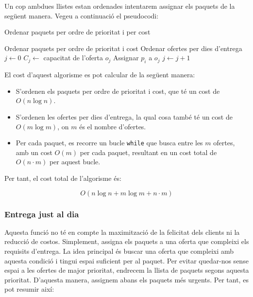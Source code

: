 \documentclass[a4paper]{article}
\begin{document}
	Un cop ambdues llistes estan ordenades intentarem assignar els paquets de la següent manera. Vegeu a continuació el pseudocodi:
	
	\begin{algorithm} [H]
		\caption{Ordenar paquets per ordre de prioritat i per cost}
		\begin{algorithmic}[1]
			\State Ordenar paquets per ordre de prioritat i cost
			\State Ordenar ofertes per dies d'entrega
			\State $j \gets 0$
			\State $C_j \gets$ capacitat de l'oferta $o_j$
			\State Assignar $p_i$ a $o_j$
			\Else
			\State $j \gets j + 1$ 
			\EndIf
			\EndWhile
			\EndFor
		\end{algorithmic}
	\end{algorithm}
	
	El cost d'aquest algorisme es pot calcular de la següent manera:
	
	\begin{itemize}
		\item S'ordenen els paquets per ordre de prioritat i cost, que té un cost de $O(n \log n)$.
		\item S'ordenen les ofertes per dies d'entrega, la qual cosa també té un cost de $O(m \log m)$, on $m$ és el nombre d'ofertes.
		\item Per cada paquet, es recorre un bucle \texttt{while} que busca entre les $m$ ofertes, amb un cost $O(m)$ per cada paquet, resultant en un cost total de $O(n \cdot m)$ per aquest bucle.
	\end{itemize}
	
	Per tant, el cost total de l'algorisme és:
	
	\[
	O(n \log n + m \log m + n \cdot m)
	\]
	
	\subsubsection{Entrega just al dia}
	\label{sec:GenSolIni_dia}
	
	Aquesta funció no té en compte la maximització de la felicitat dels clients ni la reducció de costos. Simplement, assigna els paquets a una oferta que compleixi els requisits d'entrega. La idea principal és buscar una oferta que compleixi amb aquesta condició i tingui espai suficient per al paquet. Per evitar quedar-nos sense espai a les ofertes de major prioritat, endrecem la llista de paquets segons aquesta prioritat. D'aquesta manera, assignem abans els paquets més urgents. Per tant, es pot resumir així:
	
\end{document}
